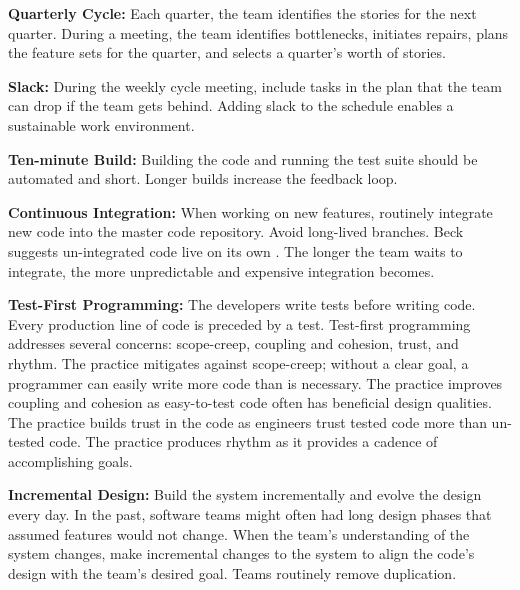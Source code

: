 

\textbf{Quarterly Cycle:} Each quarter, the team identifies the stories for the next quarter.  During a meeting, the team identifies bottlenecks, initiates repairs, plans the feature sets for the quarter, and selects a quarter's worth of stories. 


\textbf{Slack:} During the weekly cycle meeting, include tasks in the plan that the team can drop if the team gets behind. Adding slack to the schedule enables a sustainable work environment.

\textbf{Ten-minute Build:} Building the code and running the test suite should be automated and short. Longer builds increase the feedback loop. 

\textbf{Continuous Integration:} When working on new features, routinely integrate new code into the master code repository. Avoid long-lived branches. Beck suggests un-integrated code live on its own   \cite{BeckExtremeProgramming2004}.  The longer the team waits to integrate, the more unpredictable and expensive integration becomes. 

\textbf{Test-First Programming:} The developers write tests before writing code. Every production line of code is preceded by a test.  Test-first programming addresses several concerns: scope-creep,  coupling and cohesion, trust, and rhythm. The practice mitigates against scope-creep; without a clear goal, a programmer can easily write more code than is necessary. The practice improves coupling and cohesion as easy-to-test code often has beneficial design qualities. The practice builds trust in the code as engineers trust tested code more than un-tested code. The practice produces rhythm as it provides a cadence of accomplishing goals.

\textbf{Incremental Design:} Build the system incrementally and evolve the design every day. In the past, software teams might often had long design phases that assumed features would not change. When the team's understanding of the system changes, make incremental changes to the system to align the code's design with the team's desired goal. Teams routinely remove duplication.

